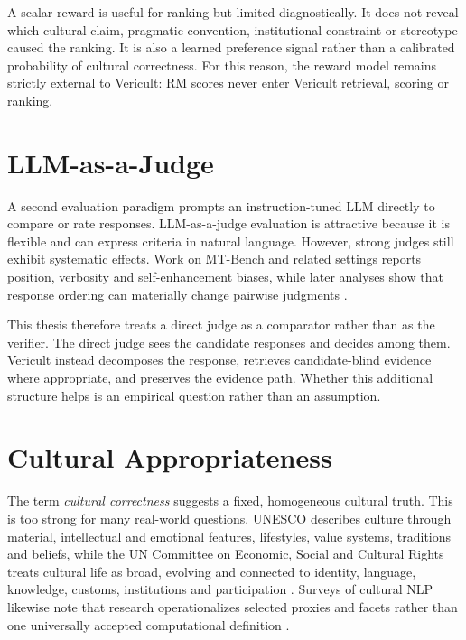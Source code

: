 A scalar reward is useful for ranking but limited diagnostically. It does not reveal which cultural claim, pragmatic convention, institutional constraint or stereotype caused the ranking. It is also a learned preference signal rather than a calibrated probability of cultural correctness. For this reason, the reward model remains strictly external to Vericult: RM scores never enter Vericult retrieval, scoring or ranking.

\section{LLM-as-a-Judge}

A second evaluation paradigm prompts an instruction-tuned LLM directly to compare or rate responses. LLM-as-a-judge evaluation is attractive because it is flexible and can express criteria in natural language. However, strong judges still exhibit systematic effects. Work on MT-Bench and related settings reports position, verbosity and self-enhancement biases, while later analyses show that response ordering can materially change pairwise judgments \parencite{zheng2023llmjudge,wang2024notfairevaluators}.

This thesis therefore treats a direct judge as a comparator rather than as the verifier. The direct judge sees the candidate responses and decides among them. Vericult instead decomposes the response, retrieves candidate-blind evidence where appropriate, and preserves the evidence path. Whether this additional structure helps is an empirical question rather than an assumption.

\section{Cultural Appropriateness}
\label{sec:cultural-appropriateness}

The term \emph{cultural correctness} suggests a fixed, homogeneous cultural truth. This is too strong for many real-world questions. UNESCO describes culture through material, intellectual and emotional features, lifestyles, value systems, traditions and beliefs, while the UN Committee on Economic, Social and Cultural Rights treats cultural life as broad, evolving and connected to identity, language, knowledge, customs, institutions and participation \parencite{unesco2001culturaldiversity,cescr2009gc21}. Surveys of cultural NLP likewise note that research operationalizes selected proxies and facets rather than one universally accepted computational definition \parencite{adilazuarda2024culture,liu2025culturallyaware,pawar2025culturalawareness}.

